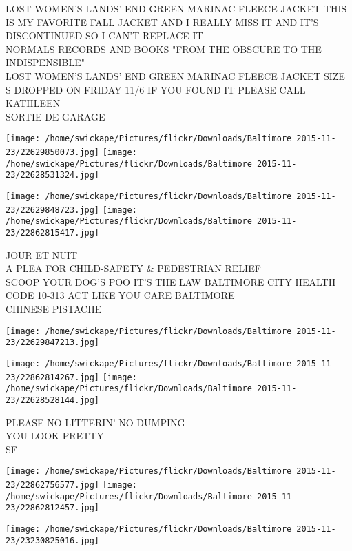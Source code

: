 \documentclass[10pt,letterpaper]{article}
\begin{document}
LOST WOMEN'S LANDS' END GREEN MARINAC FLEECE JACKET THIS IS MY FAVORITE FALL JACKET AND I REALLY MISS IT AND IT'S DISCONTINUED SO I CAN'T REPLACE IT\\
NORMALS RECORDS AND BOOKS "FROM THE OBSCURE TO THE INDISPENSIBLE"\\
LOST WOMEN'S LANDS' END GREEN MARINAC FLEECE JACKET SIZE S DROPPED ON FRIDAY 11/6 IF YOU FOUND IT PLEASE CALL KATHLEEN\\
SORTIE DE GARAGE\\
\pagebreak

\texttt{[image: /home/swickape/Pictures/flickr/Downloads/Baltimore 2015-11-23/22629850073.jpg]}
\texttt{[image: /home/swickape/Pictures/flickr/Downloads/Baltimore 2015-11-23/22628531324.jpg]}

\texttt{[image: /home/swickape/Pictures/flickr/Downloads/Baltimore 2015-11-23/22629848723.jpg]}
\texttt{[image: /home/swickape/Pictures/flickr/Downloads/Baltimore 2015-11-23/22862815417.jpg]}

JOUR ET NUIT\\
A PLEA FOR CHILD{-}SAFETY \& PEDESTRIAN RELIEF\\
SCOOP YOUR DOG'S POO IT'S THE LAW BALTIMORE CITY HEALTH CODE 10{-}313 ACT LIKE YOU CARE BALTIMORE\\
CHINESE PISTACHE\\
\pagebreak

\texttt{[image: /home/swickape/Pictures/flickr/Downloads/Baltimore 2015-11-23/22629847213.jpg]}

\vspace{0.25in}
\texttt{[image: /home/swickape/Pictures/flickr/Downloads/Baltimore 2015-11-23/22862814267.jpg]}
\texttt{[image: /home/swickape/Pictures/flickr/Downloads/Baltimore 2015-11-23/22628528144.jpg]}

PLEASE NO LITTERIN' NO DUMPING\\
YOU LOOK PRETTY\\
SF\\
\pagebreak

\texttt{[image: /home/swickape/Pictures/flickr/Downloads/Baltimore 2015-11-23/22862756577.jpg]}
\texttt{[image: /home/swickape/Pictures/flickr/Downloads/Baltimore 2015-11-23/22862812457.jpg]}

\vspace{0.25in}
\texttt{[image: /home/swickape/Pictures/flickr/Downloads/Baltimore 2015-11-23/23230825016.jpg]}
\end{document}
